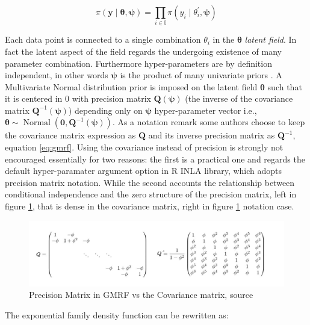 \documentclass[
  12pt,
  a4paper,
  oneside]{book}
\theoremstyle{definition}
\theoremstyle{definition}
\theoremstyle{definition}
\theoremstyle{remark}
\begin{document}
\begin{equation}
\pi(\boldsymbol{y} \mid \boldsymbol{\theta}, \boldsymbol{\psi})=\prod_{i \in \mathbb{I}} \pi\left(y_{i} \mid \theta^{\prime}_{i}, \boldsymbol{\psi}\right)
\label{eq:likelihood}
\end{equation}

Each data point is connected to a single combination \(\theta_{i}\) in the \(\boldsymbol{\theta}\) \emph{latent field}. In fact the latent aspect of the field regards the undergoing existence of many parameter combination. Furthermore hyper-parameters are by definition independent, in other words \(\boldsymbol{\psi}\) is the product of many univariate priors \citep{Bayesian_INLA_Rubio}. A Multivariate Normal distribution prior is imposed on the latent field \(\boldsymbol{\theta}\) such that it is centered in 0 with precision matrix \(\boldsymbol{Q(\psi)}\) (the inverse of the covariance matrix \(\boldsymbol{Q}^{-1}(\boldsymbol{\psi})\)) depending only on \(\boldsymbol{\psi}\) hyper-parameter vector i.e., \(\boldsymbol{\theta} \sim \operatorname{Normal}\left(\mathbf{0}, \boldsymbol{Q}^{-1}(\boldsymbol{\psi})\right)\). As a notation remark some authors choose to keep the covariance matrix expression as \(\boldsymbol{Q}\) and its inverse precision matrix as \(\boldsymbol{Q}^{-1}\), equation \eqref{eq:gmrf}. Using the covariance instead of precision is strongly not encouraged essentially for two reasons: the first is a practical one and regards the default hyper-paramater argument option in R INLA library, which adopts precision matrix notation. While the second accounts \citep{GMRFRue} the relationship between conditional independence and the
zero structure of the precision matrix, left in figure \ref{fig:precvscov}, that is dense in the covariance matrix, right in figure \ref{fig:precvscov} notation case.

\begin{figure}
\centering
\includegraphics{images/precvscov.jpg}
\caption{\label{fig:precvscov}Precision Matrix in GMRF vs the Covariance matrix, source \citet{GMRFRue}}
\end{figure}

The exponential family density function can be rewritten as:
\end{document}
